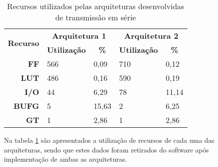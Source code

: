 \begin{table}[h!]
	\centering
	\caption{Recursos utilizados pelas arquiteturas desenvolvidas de transmissão em série}
	\label{table:recursos_planoD_planoE}

		\begin{tabular}{rllll}
			\hline
			\multicolumn{1}{c}{\multirow{2}{*}{\textbf{Recurso}}} & \multicolumn{2}{c}{\textbf{Arquitetura 1}}                                 & \multicolumn{2}{c}{\textbf{Arquitetura 2}}                               \\ \cline{2-5} 
			\multicolumn{1}{c}{}                                  & \multicolumn{1}{c}{\textbf{Utilização}} & \multicolumn{1}{c|}{\textbf{\%}} & \multicolumn{1}{c}{\textbf{Utilização}} & \multicolumn{1}{c}{\textbf{\%}} \\ \hline
			\multicolumn{1}{r|}{\textbf{FF}}                      & 566                                     & \multicolumn{1}{l|}{0,09}        & 710                                    & 0,12                            \\
			\multicolumn{1}{r|}{\textbf{LUT}}                     & 486                                     & \multicolumn{1}{l|}{0,16}        & 590                                    & 0,19                            \\
			\multicolumn{1}{r|}{\textbf{I/O}}                     & 44                                      & \multicolumn{1}{l|}{6,29}        & 78                                     & 11,14                           \\
			\multicolumn{1}{r|}{\textbf{BUFG}}                    & 5                                       & \multicolumn{1}{l|}{15,63}       & 2                                      & 6,25                            \\
			\multicolumn{1}{r|}{\textbf{GT}}                      & 1                                       & \multicolumn{1}{l|}{2,86}        & 1                                      & 2,86                            \\ \hline
		\end{tabular}%
\end{table}

Na tabela \ref{table:recursos_planoD_planoE} são apresentados a utilização de recursos de cada uma das arquiteturas, sendo que estes dados foram retirados do software após implementação de ambas as arquiteturas.
